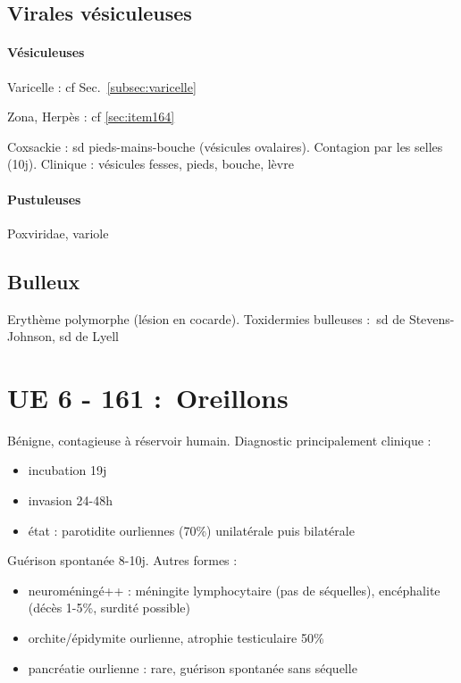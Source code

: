 \documentclass{article}
\providecommand{\tightlist}{%
  \setlength{\itemsep}{0pt}\setlength{\parskip}{0pt}}
\begin{document}
\subsection{Virales vésiculeuses}

\paragraph{Vésiculeuses}

Varicelle : cf Sec.~\ref{subsec:varicelle}

Zona, Herpès : cf \ref{sec:item164}

Coxsackie : sd pieds-mains-bouche (vésicules ovalaires). Contagion par
les selles (10j). Clinique : vésicules fesses, pieds, bouche, lèvre

\paragraph{Pustuleuses} Poxviridae, variole

\subsection{Bulleux} Erythème polymorphe (lésion en cocarde). Toxidermies bulleuses :~sd de
Stevens-Johnson, sd de Lyell

\section{UE 6 - 161 :~Oreillons}

Bénigne, contagieuse à réservoir humain. Diagnostic principalement
clinique :

\begin{itemize}
\item incubation 19j
\item invasion 24-48h
\item état : parotidite ourliennes (70\%) unilatérale puis bilatérale
\end{itemize}

Guérison spontanée 8-10j. Autres formes :

\begin{itemize}
\tightlist
\item
  neuroméningé++ : méningite lymphocytaire (pas de séquelles),
  encéphalite (décès 1-5\%, surdité possible)
\item
  orchite/épidymite ourlienne, atrophie testiculaire 50\%
\item
  pancréatie ourlienne : rare, guérison spontanée sans séquelle
\end{itemize}
\end{document}
